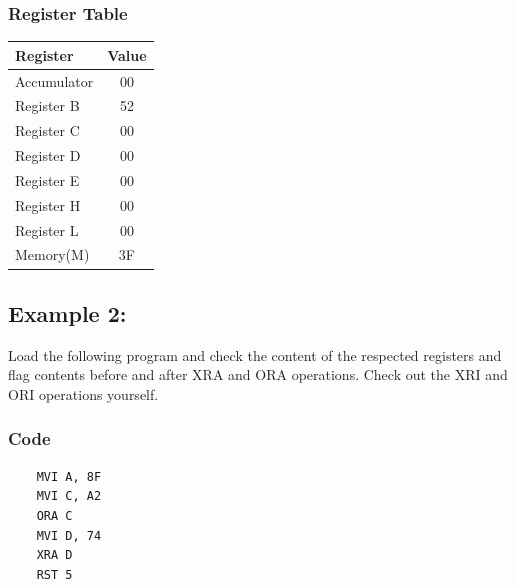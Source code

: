 \documentclass[]{report}
\begin{document}
\subsubsection {Register Table}
\begin{tabular}{lc}
    \hline
    Register & Value\\
    \hline
    Accumulator     & 00        \\
    Register B      &  52        \\
    Register C      &  00        \\
    Register D      &   00       \\
    Register E      &   00       \\
    Register H      &  00        \\
    Register L      &  00         \\
    Memory(M)       &      3F         \\
    \hline
\end{tabular}

\vspace{10mm}
\subsection*{Example 2:}
Load the following program and check the content of the respected registers and flag contents before and after XRA and ORA operations. Check out the XRI and ORI operations yourself.
\subsubsection{Code}
\begin{verbatim}
    MVI A, 8F
    MVI C, A2
    ORA C
    MVI D, 74
    XRA D
    RST 5
\end{verbatim}
\end{document}
